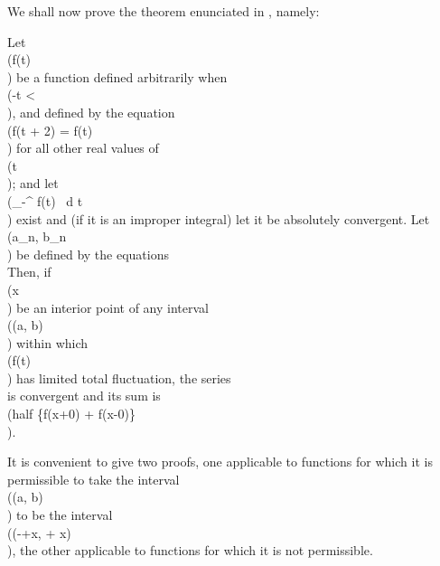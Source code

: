 We shall now prove the theorem enunciated in , namely:

Let \\(f(t)\\) be a function defined arbitrarily when \\(-\pi \leq t < \pi\\), and defined by the
equation \\(f(t + 2\pi) = f(t)\\) for all other real values of \\(t\\); and let
\\(\int_{-\pi}^{\pi} f(t) \, d t\\)
exist and (if it is an improper integral) let it be absolutely
convergent. Let \\(a_{n}, b_{n}\\) be defined by the equations
\\[ 
\pi a_{n} = \int_{-\pi}^{\pi}\! f(t) \cos nt \, d t,
\quad
\pi b_{n} = \int_{-\pi}^{\pi}\! f(t) \sin nt \, d t.
\\] 
Then, if \\(x\\) be an interior point of any interval \\((a, b)\\) within which
\\(f(t)\\) has limited total fluctuation, the series
\\[ 
\frac{1}{2} a_{0}
+
\sum_{n=1}^{\infty} (
a_{n} \cos nx + b_{n} \sin nx
)
\\] 
is convergent and its sum is \\(half \left\{f(x+0) + f(x-0)\right\}\\).

It is convenient to give two proofs, one applicable to functions for
which it is permissible to take the interval \\((a, b)\\) to be the interval
\\((-\pi+x, \pi + x)\\), the other applicable to functions for which it is
not permissible.

